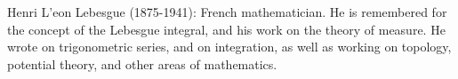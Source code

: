 Henri L'eon Lebesgue (1875-1941): French mathematician. He is
remembered for the concept of the Lebesgue integral, and his work on
the theory of measure. He wrote on trigonometric series, and on
integration, as well as working on topology, potential theory, and
other areas of mathematics.